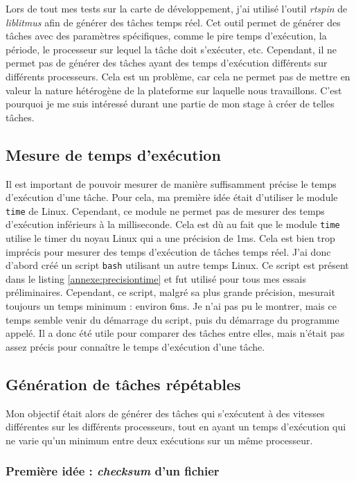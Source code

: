 Lors de tout mes tests sur la carte de développement, j'ai utilisé l'outil \textit{rtspin} de \textit{liblitmus} afin de générer des tâches temps réel. Cet outil permet de générer des tâches avec des paramètres spécifiques, comme le pire temps d'exécution, la période, le processeur sur lequel la tâche doit s'exécuter, etc. Cependant, il ne permet pas de générer des tâches ayant des temps d'exécution différents sur différents processeurs. Cela est un problème, car cela ne permet pas de mettre en valeur la nature hétérogène de la plateforme sur laquelle nous travaillons. C'est pourquoi je me suis intéressé durant une partie de mon stage à créer de telles tâches.

\subsection{Mesure de temps d'exécution}
Il est important de pouvoir mesurer de manière suffisamment précise le temps d'exécution d'une tâche. Pour cela, ma première idée était d'utiliser le module \texttt{time} de Linux. Cependant, ce module ne permet pas de mesurer des temps d'exécution inférieurs à la milliseconde. Cela est dù au fait que le module \texttt{time} utilise le timer du noyau Linux qui a une précision de 1ms. Cela est bien trop imprécis pour mesurer des temps d'exécution de tâches temps réel. J'ai donc d'abord créé un script \texttt{bash} utilisant un autre temps Linux. Ce script est présent dans le listing \ref{annexe:precisiontime} et fut utilisé pour tous mes essais préliminaires. Cependant, ce script, malgré sa plus grande précision, mesurait toujours un temps minimum : environ 6ms. Je n'ai pas pu le montrer, mais ce temps semble venir du démarrage du script, puis du démarrage du programme appelé. Il a donc été utile pour comparer des tâches entre elles, mais n'était pas assez précis pour connaître le temps d'exécution d'une tâche.


\subsection{Génération de tâches répétables}
\label{section:generation-taches-repetables}

Mon objectif était alors de générer des tâches qui s'exécutent à des vitesses différentes sur les différents processeurs, tout en ayant un temps d'exécution qui ne varie qu'un minimum entre deux exécutions sur un même processeur.

\subsubsection{Première idée : \textit{checksum} d'un fichier}

